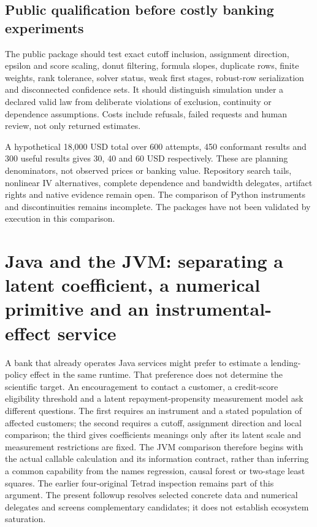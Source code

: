 \subsection{Public qualification before costly banking experiments}
The public package should test exact cutoff inclusion, assignment direction,
epsilon and score scaling, donut filtering, formula slopes, duplicate rows,
finite weights, rank tolerance, solver status, weak first stages, robust-row
serialization and disconnected confidence sets. It should distinguish
simulation under a declared valid law from deliberate violations of
exclusion, continuity or dependence assumptions. Costs include refusals,
failed requests and human review, not only returned estimates.
\citep{exec25_pyrdiv_choice}

A hypothetical 18,000 USD total over 600 attempts, 450 conformant results
and 300 useful results gives 30, 40 and 60 USD respectively. These are
planning denominators, not observed prices or banking value. Repository
search tails, nonlinear IV alternatives, complete dependence and
bandwidth delegates, artifact rights and native evidence remain open.
The comparison of Python instruments and discontinuities remains incomplete.
The packages have not been validated by execution in this comparison.
\citep{exec25_pyrdiv_choice}


\section[Java and JVM IV/RD contracts]{Java and the JVM: separating a latent coefficient, a numerical primitive and an instrumental-effect service}
\label{sec:exec25-java-iv-rd}

A bank that already operates Java services might prefer to estimate a lending-policy effect in the same runtime. That preference does not determine the scientific target. An encouragement to contact a customer, a credit-score eligibility threshold and a latent repayment-propensity measurement model ask different questions. The first requires an instrument and a stated population of affected customers; the second requires a cutoff, assignment direction and local comparison; the third gives coefficients meanings only after its latent scale and measurement restrictions are fixed. The JVM comparison therefore begins with the actual callable calculation and its information contract, rather than inferring a common capability from the names regression, causal forest or two-stage least squares. The earlier four-original Tetrad inspection remains part of this argument. The present followup resolves selected concrete data and numerical delegates and screens complementary candidates; it does not establish ecosystem saturation.~\citep{exec22_java_latent_iv_preflight,exec25_javaiv_choice}

